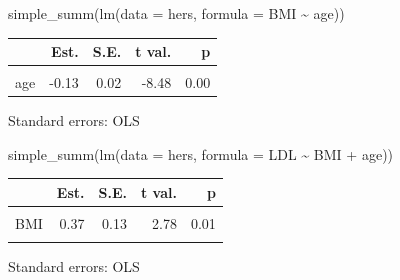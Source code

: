 \documentclass[
  letterpaper,
  DIV=11,
  numbers=noendperiod]{scrreport}
\newenvironment{Shaded}{\begin{snugshade}}{\end{snugshade}}
\newcommand{\AttributeTok}[1]{\textcolor[rgb]{0.40,0.45,0.13}{#1}}
\newcommand{\FunctionTok}[1]{\textcolor[rgb]{0.28,0.35,0.67}{#1}}
\newcommand{\NormalTok}[1]{\textcolor[rgb]{0.00,0.23,0.31}{#1}}
\newcommand{\SpecialCharTok}[1]{\textcolor[rgb]{0.37,0.37,0.37}{#1}}
\begin{document}
\begin{Shaded}
\begin{Highlighting}[]
\FunctionTok{simple\_summ}\NormalTok{(}\FunctionTok{lm}\NormalTok{(}\AttributeTok{data =}\NormalTok{ hers, }\AttributeTok{formula =}\NormalTok{ BMI }\SpecialCharTok{\textasciitilde{}}\NormalTok{ age))}
\end{Highlighting}
\end{Shaded}

\begin{table}[!h]
\centering
\begin{threeparttable}
\begin{tabular}{lrrrr}
\toprule
  & Est. & S.E. & t val. & p\\
\midrule
\cellcolor{gray!6}{(Intercept)} & \cellcolor{gray!6}{37.40} & \cellcolor{gray!6}{1.05} & \cellcolor{gray!6}{35.78} & \cellcolor{gray!6}{0.00}\\
age & -0.13 & 0.02 & -8.48 & 0.00\\
\bottomrule
\end{tabular}
\begin{tablenotes}
\item Standard errors: OLS
\end{tablenotes}
\end{threeparttable}
\end{table}

\begin{Shaded}
\begin{Highlighting}[]
\FunctionTok{simple\_summ}\NormalTok{(}\FunctionTok{lm}\NormalTok{(}\AttributeTok{data =}\NormalTok{ hers, }\AttributeTok{formula =}\NormalTok{ LDL }\SpecialCharTok{\textasciitilde{}}\NormalTok{ BMI }\SpecialCharTok{+}\NormalTok{ age))}
\end{Highlighting}
\end{Shaded}

\begin{table}[!h]
\centering
\begin{threeparttable}
\begin{tabular}{lrrrr}
\toprule
  & Est. & S.E. & t val. & p\\
\midrule
\cellcolor{gray!6}{(Intercept)} & \cellcolor{gray!6}{151.44} & \cellcolor{gray!6}{8.77} & \cellcolor{gray!6}{17.26} & \cellcolor{gray!6}{0.00}\\
BMI & 0.37 & 0.13 & 2.78 & 0.01\\
\cellcolor{gray!6}{age} & \cellcolor{gray!6}{-0.25} & \cellcolor{gray!6}{0.11} & \cellcolor{gray!6}{-2.31} & \cellcolor{gray!6}{0.02}\\
\bottomrule
\end{tabular}
\begin{tablenotes}
\item Standard errors: OLS
\end{tablenotes}
\end{threeparttable}
\end{table}
\end{document}
